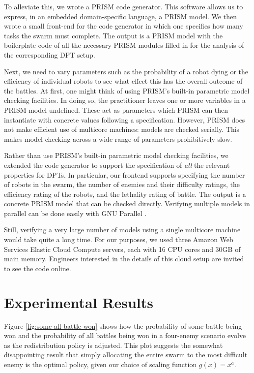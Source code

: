 \documentclass[11pt]{article}
\theoremstyle{definition}
\begin{document}
To alleviate this, we wrote a PRISM code generator.
This software allows us to express, in an embedded domain-specific language, a
PRISM model.
We then wrote a small front-end for the code generator in which one specifies
how many tasks the swarm must complete.
The output is a PRISM model with the boilerplate code of all the necessary
PRISM modules filled in for the analysis of the corresponding DPT setup.

Next, we need to vary parameters such as the probability of a robot dying or
the efficiency of individual robots to see what effect this has the overall
outcome of the battles.
%
At first, one might think of using PRISM's built-in parametric model checking
facilities.
%
In doing so, the practitioner leaves one or more variables in a PRISM model
undefined.
%
These act as parameters which PRISM can then instantiate with concrete values
following a specification.
%
However, PRISM does not make efficient use of multicore machines:
models are checked serially.
This makes model checking across a wide range of parameters prohibitively slow.

Rather than use PRISM's built-in parametric model checking facilities, we
extended the code generator to support the specification of \emph{all} the
relevant properties for DPTs.
%
In particular, our frontend supports specifying the number of robots in the
swarm, the number of enemies and their difficulty ratings, the efficiency
rating of the robots, and the lethality rating of battle.
%
The output is a concrete PRISM model that can be checked directly.
%
Verifying multiple models in parallel can be done easily with GNU Parallel
\cite{parallel}.

Still, verifying a very large number of models using a single multicore machine
would take quite a long time.
For our purposes, we used three Amazon Web Services Elastic Cloud Compute
servers, each with 16 CPU cores and 30GB of main memory.
Engineers interested in the details of this cloud setup are invited to see the
code online\footnotemark.


\section{Experimental Results}
\label{sec:results}

Figure \ref{fig:some-all-battle-won} shows how the probability of some battle
being won and the probability of all battles being won in a four-enemy scenario
evolve as the redistribution policy is adjusted.
%
This plot suggests the somewhat disappointing result that simply allocating the
entire swarm to the most difficult enemy is the optimal policy, given our
choice of scaling function $g(x) = x^a$.
\end{document}
